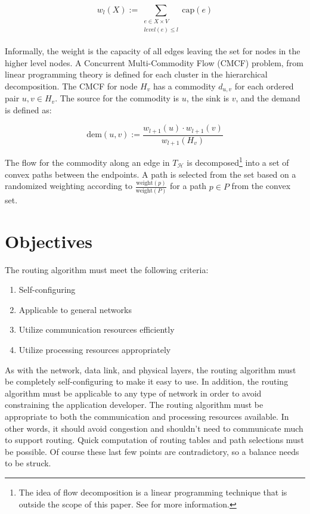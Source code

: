 \[
w_l(X):=\sum_{\begin{array}{c} 
e\in X\times V \\ 
level(e)\leq l \\
\end{array}} \textrm{cap}(e)
\]

Informally, the weight is the capacity of all edges leaving the set for nodes in the higher level nodes. A Concurrent Multi-Commodity Flow (CMCF) problem, from linear programming theory is defined for each cluster in the hierarchical decomposition. The CMCF for node $H_v $ has a commodity $d_{u,v} $ for each ordered pair $u,v\in H_v $. The source for the commodity is $u$, the sink is $v$, and the demand is defined as:

\[
\textrm{dem}(u,v):=\frac{w_{l+1}(u)\cdot w_{l+1}(v)}{w_{l+1}(H_v)}
\]

The flow for the commodity along an edge in $T_\mathscr{H} $  is decomposed\footnote{The idea of flow decomposition is a linear programming technique that is outside the scope of this paper. See \cite{ref:1993-ahuja-network_flows} for more information.} into a set of convex paths between the endpoints. A path is selected from the set based on a randomized weighting according to $\frac{\textrm{weight}(p)}{\textrm{weight}(P)} $ for a path $p\in P $ from the convex set.

\section{Objectives}\label{sec:routing:objectives}

The routing algorithm must meet the following criteria: 
\begin{enumerate}
	\item Self-configuring
	\item Applicable to general networks
	\item Utilize communication resources efficiently
	\item Utilize processing resources appropriately
\end{enumerate}
As with the network, data link, and physical layers, the routing algorithm must be completely self-configuring to make it easy to use. In addition, the routing algorithm must be applicable to any type of network in order to avoid constraining the application developer. The routing algorithm must be appropriate to both the communication and processing resources available. In other words, it should avoid congestion and shouldn't need to communicate much to support routing. Quick computation of routing tables and path selections must be possible. Of course these last few points are contradictory, so a balance needs to be struck.

